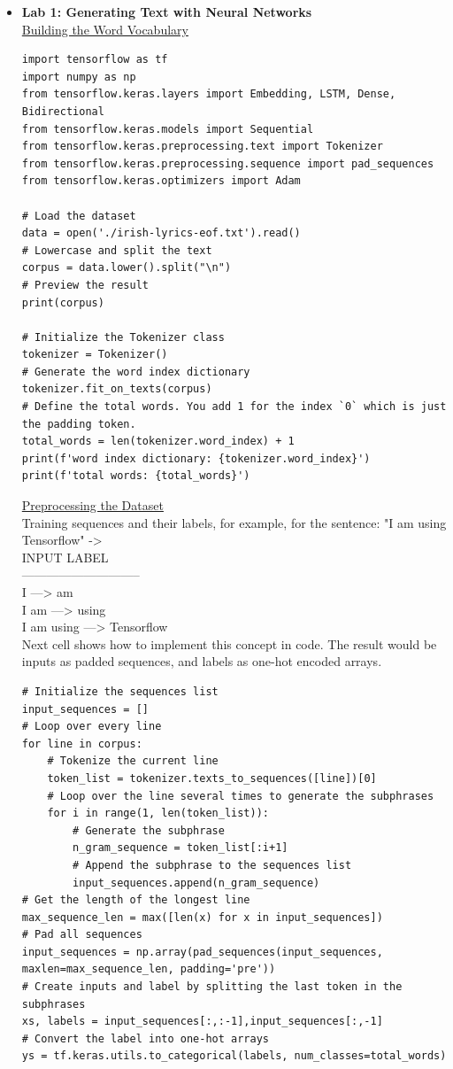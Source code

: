 \documentclass[20pt]{article}
\begin{document}
	\begin{itemize}
		\item \textbf{Lab 1: Generating Text with Neural Networks}\\
		\underline{Building the Word Vocabulary}
		\begin{verbatim}
import tensorflow as tf
import numpy as np 
from tensorflow.keras.layers import Embedding, LSTM, Dense, Bidirectional
from tensorflow.keras.models import Sequential
from tensorflow.keras.preprocessing.text import Tokenizer
from tensorflow.keras.preprocessing.sequence import pad_sequences
from tensorflow.keras.optimizers import Adam

# Load the dataset
data = open('./irish-lyrics-eof.txt').read()
# Lowercase and split the text
corpus = data.lower().split("\n")
# Preview the result
print(corpus)

# Initialize the Tokenizer class
tokenizer = Tokenizer()
# Generate the word index dictionary
tokenizer.fit_on_texts(corpus)
# Define the total words. You add 1 for the index `0` which is just the padding token.
total_words = len(tokenizer.word_index) + 1
print(f'word index dictionary: {tokenizer.word_index}')
print(f'total words: {total_words}')
		\end{verbatim}
		\underline{Preprocessing the Dataset}\\
		Training sequences and their labels, for example, for the sentence:  "I am using Tensorflow" ->\\
		INPUT              LABEL\\
		-----------------------------\\
		I			---> am\\
		I am		---> using\\
		I am using	---> Tensorflow\\
		Next cell shows how to implement this concept in code. The result would be inputs as padded sequences, and labels as one-hot encoded arrays.
		\begin{verbatim}
# Initialize the sequences list
input_sequences = []
# Loop over every line
for line in corpus:
	# Tokenize the current line
	token_list = tokenizer.texts_to_sequences([line])[0]
	# Loop over the line several times to generate the subphrases
	for i in range(1, len(token_list)):
		# Generate the subphrase
		n_gram_sequence = token_list[:i+1]
		# Append the subphrase to the sequences list
		input_sequences.append(n_gram_sequence)
# Get the length of the longest line
max_sequence_len = max([len(x) for x in input_sequences])
# Pad all sequences
input_sequences = np.array(pad_sequences(input_sequences, maxlen=max_sequence_len, padding='pre'))
# Create inputs and label by splitting the last token in the subphrases
xs, labels = input_sequences[:,:-1],input_sequences[:,-1]
# Convert the label into one-hot arrays
ys = tf.keras.utils.to_categorical(labels, num_classes=total_words)


\end{verbatim}
\end{itemize}
\end{document}
